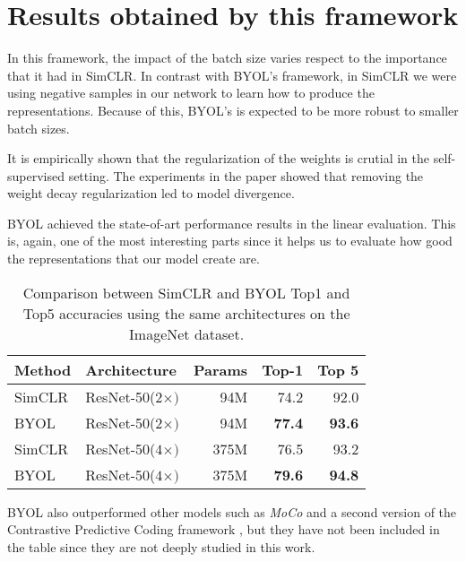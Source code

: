 \section{Results obtained by this framework}

In this framework, the impact of the batch size varies respect to the importance that it had in SimCLR. In contrast with BYOL's framework, in SimCLR we were using negative samples in our network to learn how to produce the representations. Because of this, BYOL's is expected to be more robust to smaller batch sizes. 

It is empirically shown that the regularization of the weights is crutial in the self-supervised setting. The experiments in the paper showed that removing the weight decay regularization led to model divergence.


BYOL achieved the state-of-art performance results in the linear evaluation. This is, again, one of the most interesting parts since it helps us to evaluate how good the representations that our model create are.

\begin{table}[H]
    \label{table:best:first:simclr}
\centering
\begin{tabular}{llrrr}
Method & Architecture & Params & Top-1 & Top 5 \\ \hline
SimCLR & ResNet-50($2\times)$ & 94M & 74.2 & 92.0 \\
BYOL & ResNet-50($2\times)$ & 94M & \textbf{77.4} & \textbf{93.6} \\
SimCLR & ResNet-50($4\times)$ & 375M & 76.5& 93.2 \\
BYOL & ResNet-50($4\times)$ & 375M & \textbf{79.6}& \textbf{94.8} \\
\end{tabular}
\caption{Comparison between SimCLR and BYOL Top1 and Top5 accuracies using the same architectures on the ImageNet dataset.}
\end{table}

BYOL also outperformed other models such as \emph{MoCo} \citep{he2020momentum} and a second version of the Contrastive Predictive Coding framework \citep{hénaff2020dataefficient}, but they have not been included in the table since they are not deeply studied in this work.